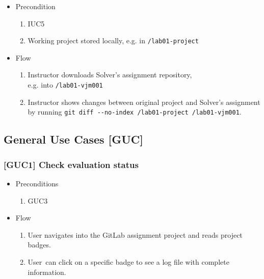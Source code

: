 \begin{itemize}
\item
  {Precondition}
    \begin{enumerate}
    \item
      {IUC5}
    \item
      {Working project stored locally, e.g. in \texttt{\textapprox/lab01-project}}
    \end{enumerate}
\end{itemize}

\begin{itemize}
\item
  {Flow}
    \begin{enumerate}
    \item
      {Instructor downloads Solver's assignment repository, \\ e.g. into \texttt{\textapprox/lab01-vjm001}}
    \item
      {Instructor shows changes between original project and Solver's assignment by running \texttt{git diff -\/-no-index \textapprox/lab01-project \textapprox/lab01-vjm001}.}
    \end{enumerate}
\end{itemize}

\subsection{General Use Cases {[}GUC{]}} \label{ssec:guc}

\subsubsection{{[}GUC1{]} Check evaluation status}

\begin{itemize}
\item
  {Preconditions}
    \begin{enumerate}
    \item
      {GUC3}
    \end{enumerate}
\end{itemize}

\begin{itemize}
\item
  {Flow}
    \begin{enumerate}
    \item
      {User navigates into the GitLab assignment project and reads project badges.}
    \item
      {User}{~can click on a specific badge to see a log file with complete information.}
    \end{enumerate}
\end{itemize}

